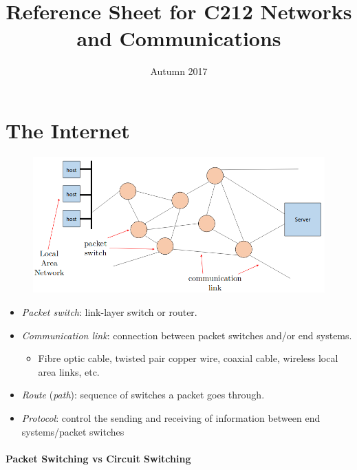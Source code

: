 \documentclass[twocolumn,english]{article}
\begin{document}
\title{Reference Sheet for C212 Networks and Communications}

\date{Autumn 2017}
\maketitle

\section{The Internet}

\begin{figure}[H]
\centering{}\includegraphics[width=0.75\linewidth]{img/internet}
\end{figure}
\begin{itemize}
\item \emph{Packet switch}: link-layer switch or router.
\item \emph{Communication link}: connection between packet switches and/or
end systems.
\begin{itemize}
\item Fibre optic cable, twisted pair copper wire, coaxial cable, wireless
local area links, etc.
\end{itemize}
\item \emph{Route} (\emph{path}): sequence of switches a packet goes through.
\item \emph{Protocol}: control the sending and receiving of information
between end systems/packet switches
\end{itemize}

\paragraph{Packet Switching vs Circuit Switching}
\end{document}
